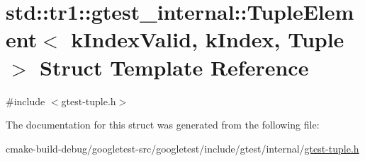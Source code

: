 \hypertarget{structstd_1_1tr1_1_1gtest__internal_1_1TupleElement}{}\section{std\+::tr1\+::gtest\+\_\+internal\+::Tuple\+Element$<$ k\+Index\+Valid, k\+Index, Tuple $>$ Struct Template Reference}
\label{structstd_1_1tr1_1_1gtest__internal_1_1TupleElement}


{\ttfamily \#include $<$gtest-\/tuple.\+h$>$}



The documentation for this struct was generated from the following file\+:\begin{DoxyCompactItemize}
\item 
cmake-\/build-\/debug/googletest-\/src/googletest/include/gtest/internal/\mbox{\hyperlink{gtest-tuple_8h}{gtest-\/tuple.\+h}}\end{DoxyCompactItemize}
